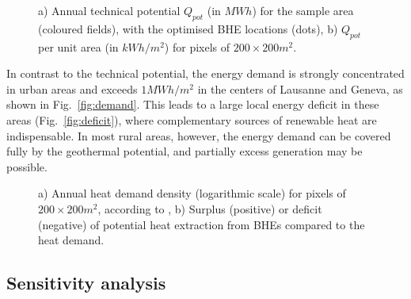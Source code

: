 \begin{figure}[tb]
\centering
{}
\caption{a) Annual technical potential $Q_{pot}$ (in $MWh$) for the sample area (coloured fields), with the optimised BHE locations (dots), b) $Q_{pot}$ per unit area (in $kWh/m^2$) for pixels of $200 \times 200m^2$.} 
\label{fig:Q_pot}
\end{figure}

In contrast to the technical potential, the energy demand is strongly concentrated in urban areas and exceeds $1 MWh/m^2$ in the centers of Lausanne and Geneva, as shown in Fig.~\ref{fig:demand}. 
This leads to a large local energy deficit in these areas (Fig.~\ref{fig:deficit}), where complementary sources of renewable heat are indispensable.
In most rural areas, however, the energy demand can be covered fully by the geothermal potential, and partially excess generation may be possible. 

\begin{figure}[tb]
\centering
{}
\caption{a) Annual heat demand density (logarithmic scale) for pixels of $200 \times 200m^2$, according to \citet{schneider_spatialtemporal_2017}, b) Surplus (positive) or deficit (negative) of potential heat extraction from BHEs compared to the heat demand.}
\label{fig:demand_cover}
\end{figure}

\subsection{Sensitivity analysis}


